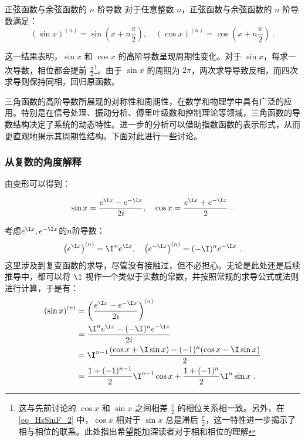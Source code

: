 \begin{corollary}{正弦函数与余弦函数的 $n$ 阶导数}
对于任意整数 $n$，正弦函数与余弦函数的 $n$ 阶导数满足：
\begin{equation}
(\sin x)^{(n)} = \sin\left(x + n\frac{\pi}{2}\right), \quad
(\cos x)^{(n)} = \cos\left(x + n\frac{\pi}{2}\right)~.
\end{equation}
\end{corollary}

这一结果表明，$\sin x$ 和 $\cos x$ 的高阶导数呈现周期性变化。对于 $\sin x$，每求一次导数，相位都会提前 $\displaystyle\frac{\pi}{2}$\footnote{这与先前讨论的 $\cos x$ 和 $\sin x$ 之间相差 $\displaystyle\frac{\pi}{2}$ 的相位关系相一致。另外，在 \autoref{eq_HsSinF_2} 中，$\cos x$ 相对于 $\sin x$ 总是滞后 $\frac{\pi}{2}$，这一特性进一步揭示了相与相位的联系。此处指出希望能加深读者对于相和相位的理解}。由于 $\sin x$ 的周期为 $2\pi$，两次求导导致反相，而四次求导则保持同相，回归原函数。

三角函数的高阶导数所展现的对称性和周期性，在数学和物理学中具有广泛的应用。特别是在信号处理、振动分析、傅里叶级数和控制理论等领域，三角函数的导数结构决定了系统的动态特性。进一步的分析可以借助指数函数的表示形式，从而更直观地揭示其周期性结构。下面对此进行一些讨论。

\subsubsection{从复数的角度解释}

由变形可以得到：

\begin{equation}
\sin x = \frac{e^{\I x} - e^{-\I x}}{2i}, \quad \cos x = \frac{e^{\I x} + e^{-\I x}}{2}~.
\end{equation}

考虑$e^{\I x},e^{-\I x}$的$n$阶导数：
\begin{equation}
\left(e^{\I x}\right)^{(n)} = \I^n e^{\I x},\quad\left(e^{-\I x}\right)^{(n)} = (-\I)^n e^{-\I x}~.
\end{equation}
这里涉及到复变函数的求导，尽管没有接触过，但不必担心。无论是此处还是后续推导中，都可以将 $\I$ 视作一个类似于实数的常数，并按照常规的求导公式或法则进行计算，于是有：
\begin{equation}
\begin{split}
\left( \sin x \right)^{(n)} &= \left( \frac{e^{\I x} - e^{-\I x}}{2i} \right)^{(n)}\\
&=\frac{\I^n e^{\I x} - (-\I)^n e^{-\I x}}{2i}\\
&=\I^{n-1} \frac{(\cos x+\I\sin x) - (-1)^{n}(\cos x-\I\sin x )}{2}\\
&=\frac{1+(-1)^{n-1}}{2}\I^{n-1} \cos x+\frac{1+(-1)^{n}}{2}\I^{n} \sin x~.
\end{split}
\end{equation}

